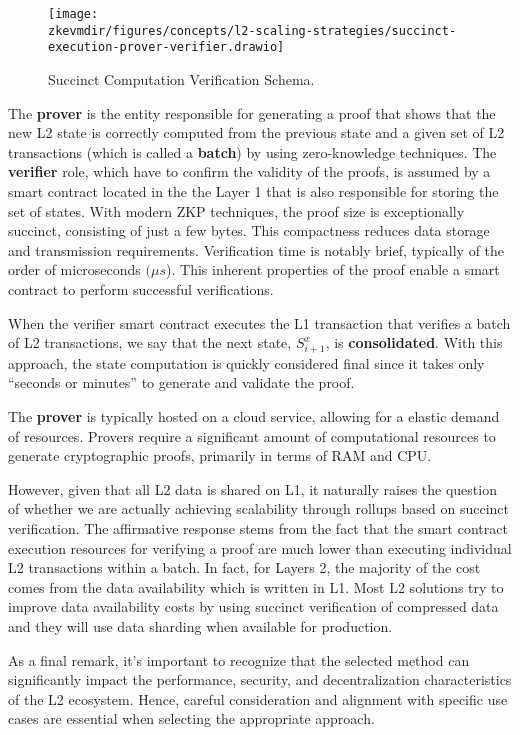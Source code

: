 \begin{figure}[h!]
\centering
\texttt{[image: \\zkevmdir/figures/concepts/l2-scaling-strategies/succinct-execution-prover-verifier.drawio]}
\caption{Succinct Computation Verification Schema.}
\label{fig:zk-rollup}
\end{figure}


The \textbf{prover} is the entity responsible for generating a proof that shows that the new L2 state is correctly computed from the previous state and a given set of L2 transactions (which is called a \textbf{batch}) by using zero-knowledge techniques. The \textbf{verifier} role, which have to confirm the validity of the proofs, is assumed by a smart contract located in the the Layer 1 that is also responsible for storing the set of states. With modern ZKP techniques, the proof size is exceptionally succinct, consisting of just a few bytes. This compactness reduces data storage and transmission requirements. Verification time is notably brief, typically of the order of microseconds $(\mu s$). This inherent properties of the proof enable a smart contract to perform successful verifications.

When the verifier smart contract executes the L1 transaction that verifies a batch of L2 transactions, we say that the next state, $S^x_{i+1}$, is \textbf{consolidated}. With this approach, the state computation is quickly considered final since it takes only ``seconds or minutes'' to generate and validate the proof.

The \textbf{prover} is typically hosted on a cloud service, allowing for a elastic demand of resources. Provers require a significant amount of computational resources to generate cryptographic proofs, primarily in terms of RAM and CPU.




However, given that all L2 data is shared on L1, it naturally raises the question of whether we are actually achieving scalability through rollups based on succinct verification. The affirmative response stems from the fact that the smart contract execution resources for verifying a proof are much lower than executing individual L2 transactions within a batch. In fact, for Layers 2, the majority of the cost comes from the data availability which is written in L1. 
Most L2 solutions try to improve data availability costs by using succinct verification of compressed data and
they will use data sharding when available for production.

As a final remark, it's important to recognize that the selected method can significantly impact the performance, security, and decentralization characteristics of the L2 ecosystem. Hence, careful consideration and alignment with specific use cases are essential when selecting the appropriate approach.

